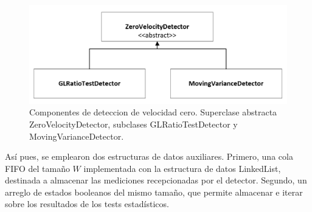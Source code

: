\begin{figure}[H]
\includegraphics[width=\textwidth]{TESIS/imagenes/chap05/detectors-hierachy.PNG}
\caption{Componentes de deteccion de velocidad cero. Superclase abstracta ZeroVelocityDetector, subclases GLRatioTestDetector y MovingVarianceDetector.}
\label{FIG: Arquitectura2}
\end{figure}

\noindent Así pues, se emplearon dos estructuras de datos auxiliares. Primero, una cola FIFO del tamaño $W$ implementada con la estructura de datos LinkedList, destinada a almacenar las mediciones recepcionadas por el detector. Segundo, un arreglo de estados booleanos del mismo tamaño, que permite almacenar e iterar sobre los resultados de los tests estadísticos.

